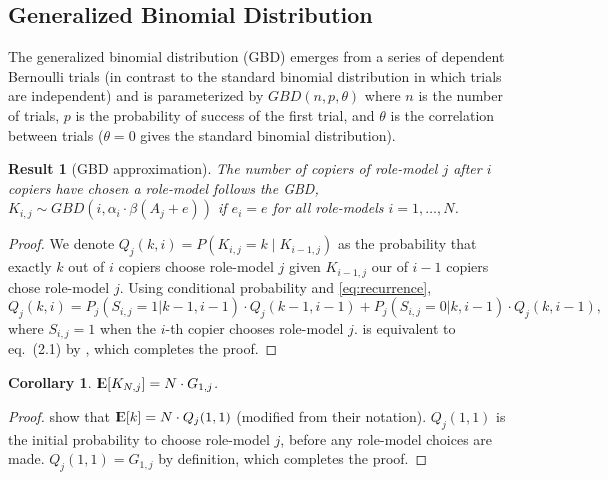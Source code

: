 \documentclass[12pt]{extarticle}
\DeclareMathOperator*{\E}{{\rm I\kern-.3em E}}
\newtheorem{corollary}{Corollary}
\newtheorem{result}{Result}
\begin{document}
\subsection*{Generalized Binomial Distribution}
The generalized binomial distribution (GBD) emerges from a series of dependent Bernoulli trials (in contrast to the standard binomial distribution in which trials are independent) and is parameterized by $GBD(n, p, \theta)$ where $n$ is the number of trials, $p$ is the probability of success of the first trial, and $\theta$ is the correlation between trials ($\theta=0$ gives the standard binomial distribution).
\\

\begin{result}[GBD approximation]
The number of copiers of role-model $j$ after $i$ copiers have chosen a role-model follows the GBD, $K_{i,j} \sim GBD(i,\alpha_i\cdot\beta(A_j+e))$ if $e_i=e$ for all role-models $i=1, \ldots, N$. 
\end{result}

\begin{proof}
We denote $Q_j(k,i)=P(K_{i,j} = k \mid K_{i-1,j})$ as the probability that exactly $k$ out of $i$ copiers choose role-model $j$ given $K_{i-1,j}$ our of $i-1$ copiers chose role-model $j$. 
Using conditional probability and \cref{eq:recurrence},
\begin{equation}\label{recursive}
Q_j(k,i) = P_j(S_{i,j}=1 | k-1,i-1) \cdot Q_j(k-1,i-1) + P_j(S_{i,j} =0 | k,i-1) \cdot Q_j(k,i-1),
\end{equation}
where $S_{i,j} =1 $ when the $i$-th copier chooses role-model $j$.
 is equivalent to eq.~(2.1) by \citet{GBD}, which completes the proof.
\end{proof}

\begin{corollary}
$\E[K_{N,j}] = N \cdot G_{1,j}$.
\end{corollary}

\begin{proof}
\citet[eq.~(2.3)]{GBD} show that 
$\E[k] = N \cdot Q_j(1,1)$ (modified from their notation).
$Q_j(1,1)$ is the initial probability to choose role-model $j$, before any role-model choices are made.
$Q_j(1,1) = G_{1,j}$ by definition, which completes the proof.
\end{proof}
\end{document}
